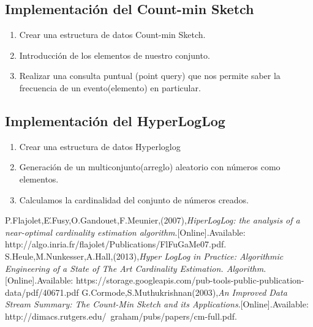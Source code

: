 \documentclass[journal]{IEEEtran}
\begin{document}
\subsection{Implementaci\'on del Count-min Sketch}

    \begin{enumerate}
	    \item
            Crear una estructura de datos Count-min Sketch.
	    \item
	    Introducción de los elementos de nuestro conjunto.
	    \item
	    Realizar una consulta puntual (point query) que nos permite saber la frecuencia de un evento(elemento) en particular.
	    
        \end{enumerate}

\subsection{Implementaci\'on del HyperLogLog}

     \begin{enumerate}
        \item
            Crear una estructura de datos Hyperloglog
	    \item
	    Generaci\'on de un multiconjunto(arreglo) aleatorio con n\'umeros como elementos. 
	    \item
	    Calculamos la cardinalidad del conjunto de n\'umeros creados.
        \end{enumerate}

\begin{thebibliography}{3}

 P.Flajolet,E\'.Fusy,O.Gandouet,F.Meunier,(2007),\textit{HiperLogLog: the analysis of a near-optimal cardinality estimation algorithm}.[Online].Available:
http://algo.inria.fr/flajolet/Publications/FlFuGaMe07.pdf.
 S.Heule,M.Nunkesser,A.Hall,(2013),\textit{Hyper LogLog in Practice: Algorithmic Engineering of a State of The Art Cardinality Estimation. Algorithm}.[Online].Available:
https://storage.googleapis.com/pub-tools-public-publication-data/pdf/40671.pdf
 G.Cormode,S.Muthukrishnan(2003),\textit{An Improved Data Stream Summary: The Count-Min Sketch and its Applications}.[Online].Available:
http://dimacs.rutgers.edu/~graham/pubs/papers/cm-full.pdf.
\end{thebibliography}
\end{document}

